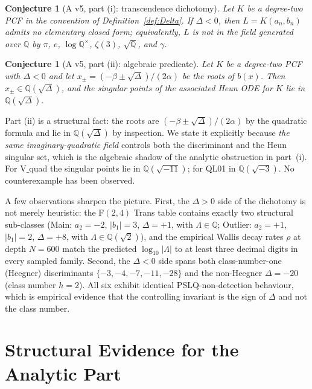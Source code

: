 \documentclass[12pt]{amsart}
\newtheorem{conjecture}[theorem]{Conjecture}
\theoremstyle{definition}
\begin{document}
\begin{conjecture}[A v5, part (i): transcendence dichotomy]
\label{conj:A1}
Let $K$ be a degree-two PCF in the convention of Definition~\ref{def:Delta}.
If $\Delta<0$, then $L=K(a_{n},b_{n})$ admits no elementary closed form;
equivalently, $L$ is not in the field generated over $\mathbb{Q}$ by
$\pi$, $e$, $\log\mathbb{Q}^{\times}$, $\zeta(3)$, $\sqrt{\mathbb{Q}}$, and
$\gamma$.
\end{conjecture}

\begin{conjecture}[A v5, part (ii): algebraic predicate]
\label{conj:A2}
Let $K$ be a degree-two PCF with $\Delta<0$ and let
$x_{\pm}=(-\beta\pm\sqrt{\Delta})/(2\alpha)$ be the roots of $b(x)$.
Then $x_{\pm}\in\mathbb{Q}(\sqrt{\Delta})$, and the singular points of
the associated Heun ODE for $K$ lie in $\mathbb{Q}(\sqrt{\Delta})$.
\end{conjecture}

Part (ii) is a structural fact: the roots are
$(-\beta\pm\sqrt{\Delta})/(2\alpha)$ by the quadratic formula and lie in
$\mathbb{Q}(\sqrt{\Delta})$ by inspection. We state it explicitly because
\emph{the same imaginary-quadratic field} controls both
the discriminant and the Heun singular set, which is the algebraic
shadow of the analytic obstruction in part~(i). For V$\_$quad the
singular points lie in $\mathbb{Q}(\sqrt{-11})$; for QL01 in
$\mathbb{Q}(\sqrt{-3})$. No counterexample has been observed.

A few observations sharpen the picture. First, the $\Delta>0$ side of the
dichotomy is not merely heuristic: the F$(2,4)$ Trans table contains
exactly two structural sub-classes (Main: $a_{2}=-2$, $|b_{1}|=3$,
$\Delta=+1$, with $\Lambda\in\mathbb{Q}$; Outlier: $a_{2}=+1$,
$|b_{1}|=2$, $\Delta=+8$, with $\Lambda\in\mathbb{Q}(\sqrt{2})$), and the
empirical Wallis decay rates $\rho$ at depth $N=600$ match the predicted
$\log_{10}|\Lambda|$ to at least three decimal digits in every sampled
family. Second, the $\Delta<0$ side spans both class-number-one (Heegner)
discriminants $\{-3,-4,-7,-11,-28\}$ and the non-Heegner $\Delta=-20$
(class number $h=2$). All six exhibit identical PSLQ-non-detection
behaviour, which is empirical evidence that the controlling invariant is
the sign of $\Delta$ and not the class number.

\section{Structural Evidence for the Analytic Part}\label{sec:structural}
\end{document}

